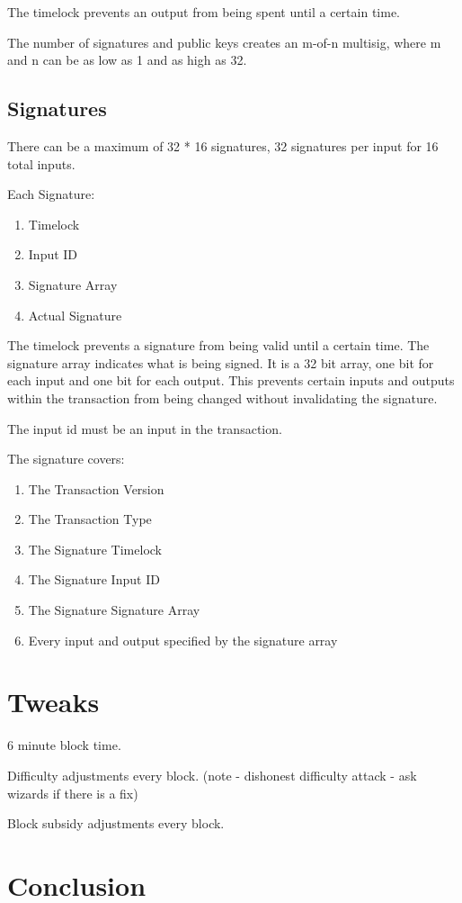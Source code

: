 \documentclass[twocolumn]{article}
\begin{document}
The timelock prevents an output from being spent until a certain time.

The number of signatures and public keys creates an m-of-n multisig, where m and n can be as low as 1 and as high as 32.

\subsection{Signatures}
There can be a maximum of 32 * 16 signatures, 32 signatures per input for 16 total inputs.

Each Signature:
\begin{enumerate}
	\item Timelock
	\item Input ID
	\item Signature Array
	\item Actual Signature
\end{enumerate}

The timelock prevents a signature from being valid until a certain time.
The signature array indicates what is being signed.
It is a 32 bit array, one bit for each input and one bit for each output.
This prevents certain inputs and outputs within the transaction from being changed without invalidating the signature.

The input id must be an input in the transaction.

The signature covers:
\begin{enumerate}
	\item The Transaction Version
	\item The Transaction Type
	\item The Signature Timelock
	\item The Signature Input ID
	\item The Signature Signature Array
	\item Every input and output specified by the signature array
\end{enumerate}

\section{Tweaks}
6 minute block time.

Difficulty adjustments every block. (note - dishonest difficulty attack - ask wizards if there is a fix)

Block subsidy adjustments every block.

\section{Conclusion}

\onecolumn
\begin{bibliography}{2}

\bibitem{}

\end{bibliography}
\end{document}
